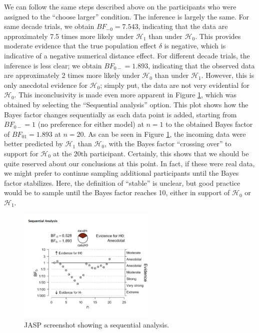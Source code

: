 \documentclass[english,,doc,floatsintext]{apa6}
\begin{document}
We can follow the same steps described above on the participants who were assigned to the \enquote{choose larger} condition. The inference is largely the same. For same decade trials, we obtain \(BF_{-0}=7.543\), indicating that the data are approximately 7.5 times more likely under \(\mathcal{H}_1\) than under \(\mathcal{H}_0\). This provides moderate evidence that the true population effect \(\delta\) is negative, which is indicative of a negative numerical distance effect. For different decade trials, the inference is less clear; we obtain \(BF_{0-}=1.893\), indicating that the observed data are approximately 2 times more likely under \(\mathcal{H}_0\) than under \(\mathcal{H}_1\). However, this is only anecdotal evidence for \(\mathcal{H}_0\); simply put, the data are not very evidential for \(\mathcal{H}_0\). This inconclusivity is made even more apparent in Figure \ref{fig:ttestSequential}, which was obtained by selecting the \enquote{Sequential analysis} option. This plot shows how the Bayes factor changes sequentially as each data point is added, starting from \(BF_{0-}=1\) (no preference for either model) at \(n=1\) to the obtained Bayes factor of \(BF_{01}=1.893\) at \(n=20\). As can be seen in Figure \ref{fig:ttestSequential}, the incoming data were better predicted by \(\mathcal{H}_1\) than \(\mathcal{H}_0\), with the Bayes factor \enquote{crossing over} to support for \(\mathcal{H}_0\) at the 20th participant. Certainly, this shows that we should be quite reserved about our conclusions at this point. In fact, if these were real data, we might prefer to continue sampling additional participants until the Bayes factor stabilizes. Here, the definition of \enquote{stable} is unclear, but good practice would be to sample until the Bayes factor reaches 10, either in support of \(\mathcal{H}_0\) or \(\mathcal{H}_1\).

\begin{figure}
\centering
\includegraphics[width=0.6\textwidth,height=\textheight]{figures/ttestSequential.png}
\caption{\label{fig:ttestSequential}JASP screenshot showing a sequential analysis.}
\end{figure}
\end{document}
